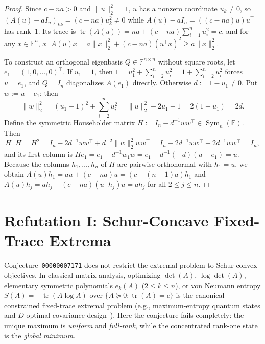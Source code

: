 \documentclass[11pt]{article}
\theoremstyle{definition}
\theoremstyle{remark}
\newcommand{\tr}{\operatorname{tr}}
\newcommand{\Sym}{\operatorname{Sym}}
\begin{document}
\begin{proof}
Since $c - n a > 0$ and $\|u\|_2^2 = 1$, $u$ has a nonzero coordinate $u_k \neq 0$, so $(A(u) - a I_n)_{kk} = (c - n a) u_k^2 \neq 0$ while $A(u) - a I_n = ((c - n a)u) u^\top$ has rank~$1$. Its trace is $\tr(A(u)) = n a + (c - n a)\sum_{i=1}^n u_i^2 = c$, and for any $x \in \mathbb{F}^n$, $x^\top A(u) x = a \|x\|_2^2 + (c - n a)(u^\top x)^2 \ge a \|x\|_2^2$.

To construct an orthogonal eigenbasis $Q \in \mathbb{F}^{n \times n}$ without square roots, let $e_1 = (1, 0, \dots, 0)^\top$. If $u_1 = 1$, then $1 = u_1^2 + \sum_{i=2}^n u_i^2 = 1 + \sum_{i=2}^n u_i^2$ forces $u = e_1$, and $Q = I_n$ diagonalizes $A(e_1)$ directly. Otherwise $d := 1 - u_1 \neq 0$. Put $w := u - e_1$; then
\[
  \|w\|_2^2 = (u_1 - 1)^2 + \sum_{i=2}^n u_i^2 = \|u\|_2^2 - 2u_1 + 1 = 2(1 - u_1) = 2d.
\]
Define the symmetric Householder matrix $H := I_n - d^{-1} w w^\top \in \Sym_n(\mathbb{F})$. Then
\[
  H^\top H = H^2 = I_n - 2 d^{-1} w w^\top + d^{-2} \|w\|_2^2 w w^\top
  = I_n - 2 d^{-1} w w^\top + 2 d^{-1} w w^\top = I_n,
\]
and its first column is $H e_1 = e_1 - d^{-1} w_1 w = e_1 - d^{-1}(-d)(u - e_1) = u$. Because the columns $h_1, \dots, h_n$ of $H$ are pairwise orthonormal with $h_1 = u$, we obtain $A(u) h_1 = a u + (c - n a) u = (c - (n-1)a) h_1$ and $A(u) h_j = a h_j + (c - n a)(u^\top h_j) u = a h_j$ for all $2 \le j \le n$.
\end{proof}

\section{Refutation I: Schur-Concave Fixed-Trace Extrema}
\label{sec:r1}

Conjecture~\texttt{00000007171} does not restrict the extremal problem to Schur-convex objectives. In classical matrix analysis, optimizing $\det(A)$, $\log\det(A)$, elementary symmetric polynomials $e_k(A)$ ($2 \le k \le n$), or von Neumann entropy $S(A) = -\tr(A \log A)$ over $\{A \succeq 0 : \tr(A) = c\}$ is the canonical constrained fixed-trace extremal problem (e.g., maximum-entropy quantum states and $D$-optimal covariance design~\cite{Bhatia1997,HJ2013}). Here the conjecture fails completely: the unique maximum is \emph{uniform} and \emph{full-rank}, while the concentrated rank-one state is the \emph{global minimum}.
\end{document}
